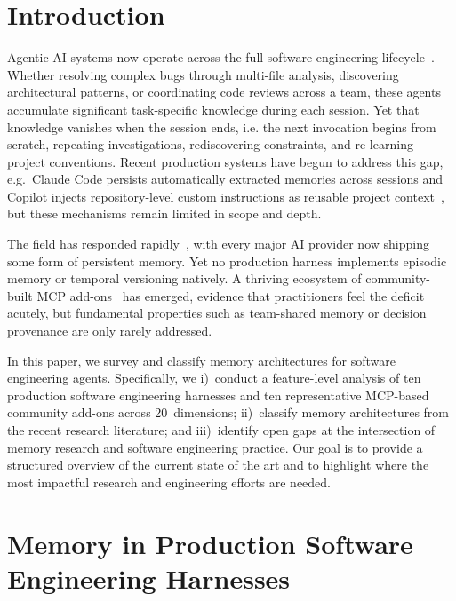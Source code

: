 \documentclass[runningheads]{llncs}
\begin{document}
\section{Introduction}\label{sec:intro}

Agentic AI systems now operate across the full software engineering
lifecycle~\cite{becker2026,liu2024survey,jimenez2024swebench}. Whether
resolving complex bugs through multi-file analysis, discovering
architectural patterns, or coordinating code reviews across a team, these
agents accumulate significant task-specific knowledge during each
session. Yet that knowledge vanishes when the session ends, i.e. the next
invocation begins from scratch, repeating investigations, rediscovering
constraints, and re-learning project conventions. Recent production systems have begun to address this gap, e.g.\ Claude Code persists automatically extracted memories across sessions and Copilot injects repository-level custom instructions as reusable project context~\cite{agentreadmes2025}, but these mechanisms remain limited in scope and depth.

The field has responded rapidly~\cite{hu2025survey,memagents2026}, with every major AI provider now shipping
some form of persistent memory. Yet no production harness implements episodic memory or temporal versioning natively. A thriving ecosystem of community-built MCP add-ons~\cite{mcpmemory2026} has emerged, evidence that practitioners feel the deficit acutely, but fundamental properties such as team-shared memory or decision provenance are only rarely addressed.

In this paper, we survey and classify memory architectures for software engineering agents. Specifically, we i)~conduct a feature-level analysis of ten production software engineering harnesses and ten representative MCP-based community add-ons across 20~dimensions; ii)~classify memory architectures from the recent research literature; and iii)~identify open gaps at the intersection of memory research and software engineering practice. Our goal is to provide a structured overview of the current state of the art and to highlight where the most impactful research and engineering efforts are needed.

\section{Memory in Production Software Engineering Harnesses}\label{sec:harnesses}
\end{document}
